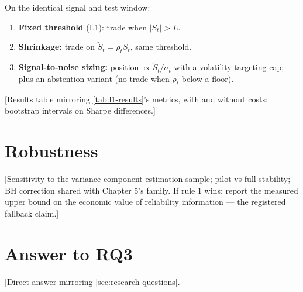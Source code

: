 On the identical signal and test window:
\begin{enumerate}
  \item \textbf{Fixed threshold} (L1): trade when $|S_t| > L$.
  \item \textbf{Shrinkage:} trade on $\tilde{S}_t = \rho_t S_t$, same
        threshold.
  \item \textbf{Signal-to-noise sizing:} position $\propto
        \tilde{S}_t/\sigma_t$ with a volatility-targeting cap; plus an
        abstention variant (no trade when $\rho_t$ below a floor).
\end{enumerate}

[Results table mirroring \cref{tab:l1-results}'s metrics, with and
without costs; bootstrap intervals on Sharpe differences.]

\section{Robustness}
\label{sec:l3-robustness}

[Sensitivity to the variance-component estimation sample; pilot-vs-full
stability; BH correction shared with Chapter 5's family. If rule 1
wins: report the measured upper bound on the economic value of
reliability information --- the registered fallback claim.]

\section{Answer to RQ3}
\label{sec:l3-answer}

[Direct answer mirroring \cref{sec:research-questions}.]
